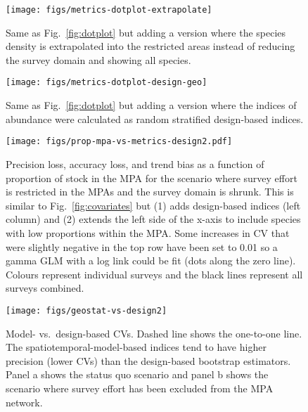 \documentclass[12pt]{article}
\begin{document}
\begin{figure}[htb]
    \centering
    \texttt{[image: figs/metrics-dotplot-extrapolate]}
    \caption{Same as Fig.~\ref{fig:dotplot} but adding a version where the species density is extrapolated into the restricted areas instead of reducing the survey domain and showing all species.}
    \label{fig:dotplot-extrapolate}
\end{figure}

\begin{figure}[htb]
    \centering
    \texttt{[image: figs/metrics-dotplot-design-geo]}
    \caption{Same as Fig.~\ref{fig:dotplot} but adding a version where the indices of abundance were calculated as random stratified design-based indices.}
    \label{fig:metrics-design-geo}
\end{figure}

\clearpage



\begin{figure}[htb]
    \centering
    \texttt{[image: figs/prop-mpa-vs-metrics-design2.pdf]}
    \caption{Precision loss, accuracy loss, and trend bias as a function of proportion of stock in the MPA for the scenario where survey effort is restricted in the MPAs and the survey domain is shrunk. This is similar to Fig.~\ref{fig:covariates} but (1) adds design-based indices (left column) and (2) extends the left side of the x-axis to include species with low proportions within the MPA. Some increases in CV that were slightly negative in the top row have been set to 0.01 so a gamma GLM with a log link could be fit (dots along the zero line). Colours represent individual surveys and the black lines represent all surveys combined.}
    \label{fig:covariates-design}
\end{figure}

\clearpage

\begin{figure}[htb]
    \centering
    \texttt{[image: figs/geostat-vs-design2]}
    \caption{Model- vs.\ design-based CVs. Dashed line shows the one-to-one line. The spatiotemporal-model-based indices tend to have higher precision (lower CVs) than the design-based bootstrap estimators. Panel a shows the status quo scenario and panel b shows the scenario where survey effort has been excluded from the MPA network.}
    \label{fig:design-model-cv}
\end{figure}
\end{document}
